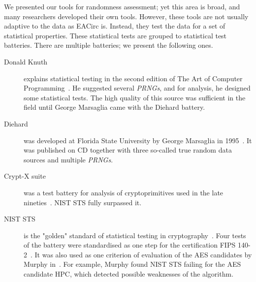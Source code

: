 \documentclass[
    digital,    %
    oneside,    %
    color,
    11pt,
    nocover,
    notable,
    nolof,
    nolot,
]{fithesis3}
\begin{document}
We presented our tools for randomness assessment; yet this area is broad, and many researchers developed their own tools. However, these tools are not usually adaptive to the data as EACirc is. Instead, they test the data for a set of statistical properties. These statistical tests are grouped to statistical test batteries. There are multiple batteries; we present the following ones. 

\begin{description}
    \item[Donald Knuth] explains statistical testing in the second edition of The Art of Computer Programming~\cite{knuth1969vol}. He suggested several \textit{PRNGs}, and for analysis, he designed some statistical tests. The high quality of this source was sufficient in the field until George Marsaglia came with the Diehard battery. %
    \item[Diehard] was developed at Florida State University by George Marsaglia in 1995~\cite{marsaglia1996diehard}. It was published on CD together with three so-called true random data sources and multiple \textit{PRNGs}. %
    \item[Crypt-X suite] was a test battery for analysis of cryptoprimitives used in the late nineties~\cite{cryptxs}. NIST STS fully surpassed it. %
    \item[NIST STS] is the "golden" standard of statistical testing in cryptography~\cite{rukhin2001statistical}. Four tests of the battery were standardised as one step for the certification FIPS 140-2~\cite{fips2001140}. It was also used as one criterion of evaluation of the AES candidates by Murphy in~\cite{murphy2000power}. For example, Murphy found NIST STS failing for the AES candidate HPC, which detected possible weaknesses of the algorithm.


\end{description}
\end{document}
